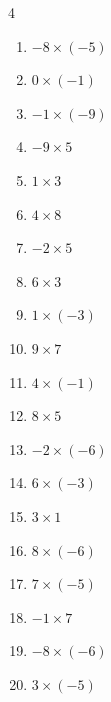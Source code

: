 \begin{multicols}{4}
\begin{enumerate}
  \item $-8\times (-5)$
        \phantom{$=40$}

  \item $0\times (-1)$
        \phantom{$=0$}

  \item $-1\times (-9)$
        \phantom{$=9$}

\columnbreak %

  \item $-9\times 5$
        \phantom{$=-45$}

  \item $1\times 3$
        \phantom{$=3$}

  \item $4\times 8$
        \phantom{$=32$}

  \item $-2\times 5$
        \phantom{$=-10$}

  \item $6\times 3$
        \phantom{$=18$}

  \item $1\times (-3)$
        \phantom{$=-3$}

  \item $9\times 7$
        \phantom{$=63$}

  \item $4\times (-1)$
        \phantom{$=-4$}

  \item $8\times 5$
        \phantom{$=40$}

  \item $-2\times (-6)$
        \phantom{$=12$}

  \item $6\times (-3)$
        \phantom{$=-18$}

  \item $3\times 1$
        \phantom{$=3$}

  \item $8\times (-6)$
        \phantom{$=-48$}

  \item $7\times (-5)$
        \phantom{$=-35$}

  \item $-1\times 7$
        \phantom{$=-7$}

  \item $-8\times (-6)$
        \phantom{$=48$}

  \item $3\times (-5)$
        \phantom{$=-15$}


\end{enumerate}
\end{multicols}
